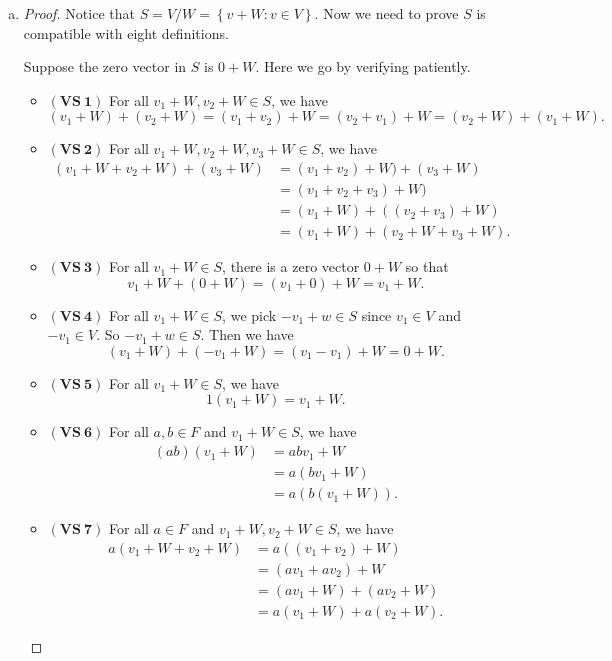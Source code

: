 \begin{Exercise}
\begin{enumerate}[(a)]
\item
\begin{proof}
Notice that $S=V/W=\left\{v+W:v\in V\right\}$. Now we need to prove $S$ is compatible with eight definitions.

Suppose the zero vector in $S$ is $0+W$. Here we go by verifying patiently.

\begin{itemize}
\item $\mathbf{(VS\ 1)}$
For all $v_1+W,v_2+W \in S$, we have
$$
(v_1+W)+(v_2+W)
= (v_1+v_2)+W
= (v_2+v_1)+W
= (v_2+W)+(v_1+W).
$$

\item $\mathbf{(VS\ 2)}$
For all $v_1+W,v_2+W,v_3+W\in S$, we have
\begin{align*}
(v_1+W+v_2+W)+(v_3+W)
&= (v_1+v_2)+W)+(v_3+W) \\
&= (v_1+v_2+v_3)+W) \\
&= (v_1+W) + ((v_2+v_3)+W) \\
&= (v_1+W) + (v_2+W+v_3+W).
\end{align*}

\item $\mathbf{(VS\ 3)}$
For all $v_1+W\in S$, there is a zero vector $0+W$ so that
$$
v_1+W+(0+W)
= (v_1+0)+W
= v_1+W.
$$

\item $\mathbf{(VS\ 4)}$
For all $v_1+W\in S$, we pick $-v_1+w\in S$ since $v_1\in V$ and $-v_1\in V$. So $-v_1+w\in S$. Then we have
$$
(v_1+W)+(-v_1+W)
= (v_1-v_1)+W
= 0+W.
$$

\item $\mathbf{(VS\ 5)}$
For all $v_1+W\in S$, we have
$$
1(v_1+W)
= v_1+W.
$$

\item $\mathbf{(VS\ 6)}$
For all $a,b\in F$ and $v_1+W\in S$, we have
\begin{align*}
(ab)(v_1+W)
&= ab v_1 + W \\
&= a(b v_1+W) \\
&= a(b(v_1+W)).
\end{align*}

\item $\mathbf{(VS\ 7)}$
For all $a\in F$ and $v_1+W,v_2+W\in S$, we have
\begin{align*}
a(v_1+W+v_2+W)
&= a((v_1+v_2)+W) \\
&= (a v_1 + a v_2) + W \\
&= (a v_1 + W) + (a v_2 + W)\\
&= a(v_1 + W)+a(v_2 + W).
\end{align*}


\end{itemize}
\end{proof}
\end{enumerate}
\end{Exercise}
